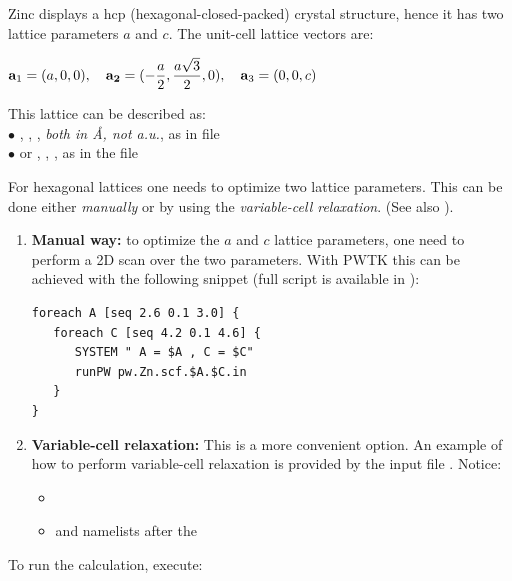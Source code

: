 \documentclass[landscape]{foils}
\begin{document}
%
Zinc displays a hcp (hexagonal-closed-packed) crystal structure, hence
it has two lattice parameters $a$ and $c$. The unit-cell lattice
vectors are:\\
%
\centerline{$\displaystyle
  {\bf a}_1=(a,0,0), \quad {\bf a_2}=(-{a\over 2},{a\sqrt{3}\over 2},0),
  \quad {\bf a}_3=(0,0,c)$}
%
This lattice can be described as:\\
$\bullet$ , , , {\em both in \AA,
  not a.u.}, as in file \\
$\bullet$ or , , ,
as in the file 

For hexagonal lattices one needs to optimize two lattice
parameters. This can be done either {\em manually} or by using the
{\em variable-cell relaxation}. (See also ).
\vspace{-1em}
\begin{enumerate}
\item {\bf Manual way:} to optimize the $a$ and $c$ lattice
  parameters, one need to perform a 2D scan over the two
  parameters. With PWTK this can be achieved with the following
  snippet (full script is available in
  ):
  \vspace{-0.5em}
  {\codecolor
\begin{verbatim}
foreach A [seq 2.6 0.1 3.0] {
   foreach C [seq 4.2 0.1 4.6] {
      SYSTEM " A = $A , C = $C"        
      runPW pw.Zn.scf.$A.$C.in
   }
}
\end{verbatim}
  }
\item {\bf Variable-cell relaxation:} This is a more convenient
  option. An example of how to perform variable-cell relaxation is
  provided by the input file . Notice:
  \begin{itemize}
  \item {}
  \item {} and  namelists after the 
  \end{itemize}
\end{enumerate}
To run the calculation, execute:\\[0.5em]
\end{document}
